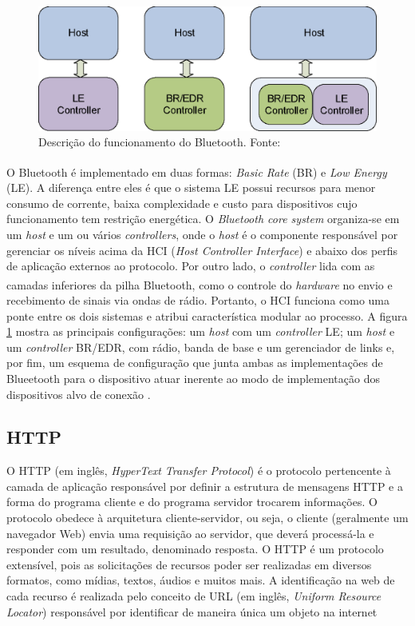 \begin{figure}[ht]
    \centering
    \includegraphics[width=.48\textwidth]{img/blueetooth-comunication.png}
    \caption{Descrição do funcionamento do Bluetooth. Fonte:\cite{bluetoothDocumentation}}\label{figBluetooth}
\end{figure}

O Bluetooth\textsuperscript{\textregistered} é implementado em duas formas: \textit{Basic Rate} (BR) e \textit{Low Energy} (LE). A diferença entre eles é que o sistema LE
possui recursos para menor consumo de corrente, baixa complexidade e custo para dispositivos cujo funcionamento tem restrição energética. O \textit{Bluetooth core system} 
organiza-se em um \textit{host} e um ou vários \textit{controllers}, onde o \textit{host} é o componente responsável 
por gerenciar os níveis acima da HCI (\textit{Host Controller Interface}) e abaixo dos perfis de aplicação externos ao protocolo. Por outro lado, o \textit{controller} 
lida com as camadas inferiores da pilha Bluetooth\textsuperscript{\textregistered}, como o controle do \textit{hardware} no envio e recebimento de sinais via ondas de rádio. Portanto, o 
HCI funciona como uma ponte entre os dois sistemas e atribui característica modular ao processo. A figura \ref{figBluetooth} mostra as principais configurações: um \textit{host} com um \textit{controller} LE; 
um \textit{host} e um \textit{controller} BR/EDR, com rádio, banda de base e um gerenciador de links e, por fim, um esquema de configuração que junta ambas as implementações de Blueetooth para o dispositivo atuar inerente 
ao modo de implementação dos dispositivos alvo de conexão \cite{bluetoothDocumentation}.

\subsection{HTTP}

O HTTP (em inglês, \textit{HyperText Transfer Protocol}) é o protocolo pertencente à camada de aplicação responsável por definir a estrutura de mensagens HTTP e a forma do programa cliente e do programa servidor 
trocarem informações. O protocolo obedece à arquitetura cliente-servidor, ou seja, o cliente (geralmente um navegador Web) envia uma requisição ao servidor, que deverá processá-la e responder com um resultado, denominado resposta. O HTTP é um protocolo extensível, pois 
as solicitações de recursos poder ser realizadas em diversos formatos, como mídias, textos, áudios e muitos mais. A identificação na web de cada recurso é realizada pelo conceito de URL (em inglês, \textit{Uniform Resource Locator}) responsável por identificar de maneira única um objeto na internet \cite[pp. 72]{redeskurose2010}

